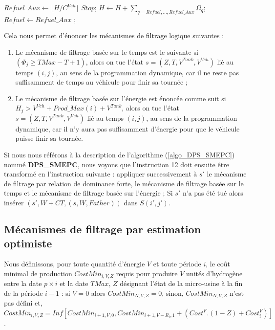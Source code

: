 \begin{itemize}[label=$\square$]
\begin{algorithm}
\begin{algorithmic}[1]
			\vspace{0.3cm}
			
			\BOUCLEPRINCIPAL
			\vspace{0.2cm}
			\STATE $Refuel\_Aux \leftarrow \lfloor H/C^{Veh} \rfloor$
			\STATE  $Stop$;
			\ELSE
			\STATE $H \leftarrow H+\sum_{q=Refuel, \dots, Refuel\_Aux} \Omega_q$;
			\STATE $Refuel \leftarrow Refuel\_Aux$ ;
			\ENDIF
			\ENDWHILE
		\end{algorithmic}
	\end{algorithm}
\end{itemize}

Cela nous permet d'énoncer les mécanismes de filtrage logique suivantes : 
\begin{enumerate}
	\item Le mécanisme de filtrage basée sur le temps est le suivante si $( \Phi_j \geq TMax - T + 1)$, alors on tue l'état $s = (Z, T, V^{Tank} , V^{Veh})$ lié au temps $(i, j)$, au sens de la programmation dynamique, car il ne reste pas suffisamment de temps au véhicule pour finir sa tournée ;
	
	\item Le mécanisme de filtrage basée sur l'énergie est énoncée comme suit si $H_j > V^{Veh} + Prod\_Max(i) + V^{Tank}$, alors on tue l'état $ s = (Z, T, V^{Tank}, V^{Veh})$ lié au temps $(i, j)$, au sens de la programmation dynamique, car il n'y aura pas suffisamment d'énergie pour que le véhicule puisse finir sa tournée.
\end{enumerate}
Si nous nous référons à la description de l'algorithme  (\ref{algo_DPS_SMEPC}) nommé \textbf{DPS\_SMEPC}, nous voyons que l'instruction 12 doit ensuite être transformé en l'instruction suivante :
appliquer successivement à $s'$ le mécanisme de filtrage par relation de dominance forte, le mécanisme de filtrage basée sur le temps et le mécanisme de filtrage basée sur l'énergie ;
Si $s'$ n'a pas été tué alors insérer $(s', W + CT, (s, W, Father))$ dans $S(i', j') $.


\subsection{Mécanismes de filtrage par estimation optimiste}
\label{CostMin_chap5}
Nous définissons, pour toute quantité d'énergie $V$ et toute période $i$, le coût minimal de production $CostMin_{i, V, Z}$ requis pour produire $V$ unités d'hydrogène entre la date $p\times i$ et la date $TMax$, $Z$ désignant l'état de la micro-usine à la fin de la période $i - 1$ : si $V = 0$ alors $CostMin_{N, V, Z} = 0 $, sinon, $CostMin_{N, V, Z}$ n'est pas défini et, $CostMin_{i, V, Z} = Inf [CostMin_{i + 1, V, 0}, CostMin_{i + 1, V - R_i, 1} + (Cost^F.(1 - Z) + Cost^V_i)]$. 


